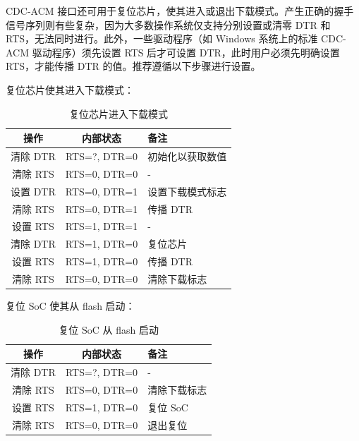 \documentclass[main\_\_CN.tex]{subfiles}
\begin{document}
CDC-ACM 接口还可用于复位芯片，使其进入或退出下载模式。产生正确的握手信号序列则有些复杂，因为大多数操作系统仅支持分别设置或清零 DTR 和 RTS，无法同时进行。此外，一些驱动程序（如 Windows 系统上的标准 CDC-ACM 驱动程序）须先设置 RTS 后才可设置 DTR，此时用户必须先明确设置 RTS，才能传播 DTR 的值。推荐遵循以下步骤进行设置。

复位芯片使其进入下载模式：

\begin{table}[H]
    \centering
    \caption{复位芯片进入下载模式}
    \label{tab:usbserialjtag-reset-soc-into-download-mode}
    \begin{tabular} {|c|c|l|}
    \hline
        \rowcolor{lightgray}
        \textbf{操作} & \textbf{内部状态} & \textbf{备注} \\\hline

        清除 DTR & RTS=?, DTR=0 & 初始化以获取数值 \\\hline
        清除 RTS & RTS=0, DTR=0 & - \\\hline
        设置 DTR & RTS=0, DTR=1 & 设置下载模式标志 \\\hline
        清除 RTS & RTS=0, DTR=1 & 传播 DTR \\\hline
        设置 RTS & RTS=1, DTR=1 & - \\\hline
        清除 DTR & RTS=1, DTR=0 & 复位芯片 \\\hline
        设置 RTS & RTS=1, DTR=0 & 传播 DTR \\\hline
        清除 RTS & RTS=0, DTR=0 & 清除下载标志\\\hline
    \end{tabular}
\end{table}

复位 SoC 使其从 flash 启动：

\begin{table}[H]
    \centering
    \caption{复位 SoC 从 flash 启动}
    \label{tab:usbserialjtag-reset-soc-into-booting}
    \begin{tabular} {|c|c|l|}
    \hline
        \rowcolor{lightgray}
        \textbf{操作} & \textbf{内部状态} & \textbf{备注} \\\hline

        清除 DTR & RTS=?, DTR=0 & - \\\hline
        清除 RTS & RTS=0, DTR=0 &  清除下载标志 \\\hline
        设置 RTS & RTS=1, DTR=0 &  复位 SoC \\\hline
        清除 RTS & RTS=0, DTR=0 & 退出复位 \\\hline
    \end{tabular}
\end{table}
\end{document}
